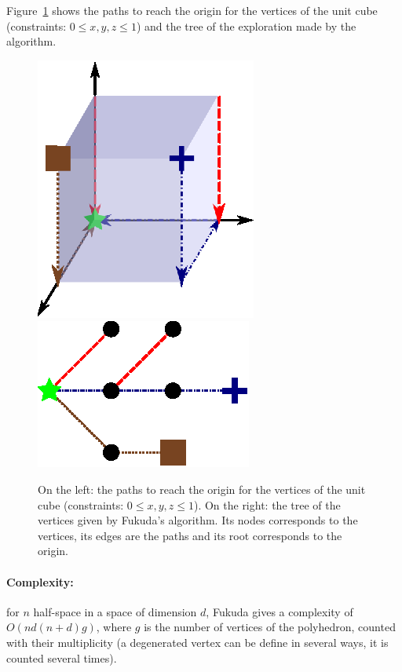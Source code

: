 Figure~\ref{ex_fuku} shows the paths to reach the origin for the vertices of the unit cube (constraints: $0\leq x,y,z \leq 1$) and the tree of the exploration made by the algorithm.

\vspace*{-1cm}

\begin{figure}
\includegraphics[scale=1.1]{images/fukuda.eps}
\hspace*{0.5cm}
\includegraphics[scale=1.5]{images/fukugraph.eps}
\caption{On the left:  the paths to reach the origin for the vertices of the unit cube (constraints: $0\leq x,y,z \leq 1$). On the right: the tree of the vertices given by Fukuda's algorithm. Its nodes corresponds to the vertices, its edges are the paths and its root corresponds to the origin.}
\label{ex_fuku}
\vspace*{-1cm}
\end{figure}

\paragraph{Complexity:} for $n$ half-space in a space of dimension $d$, Fukuda gives a complexity of $O(nd(n+d)g)$, where $g$ is the number of vertices of the polyhedron, counted with their multiplicity (a degenerated vertex can be define in several ways, it is counted several times). 
